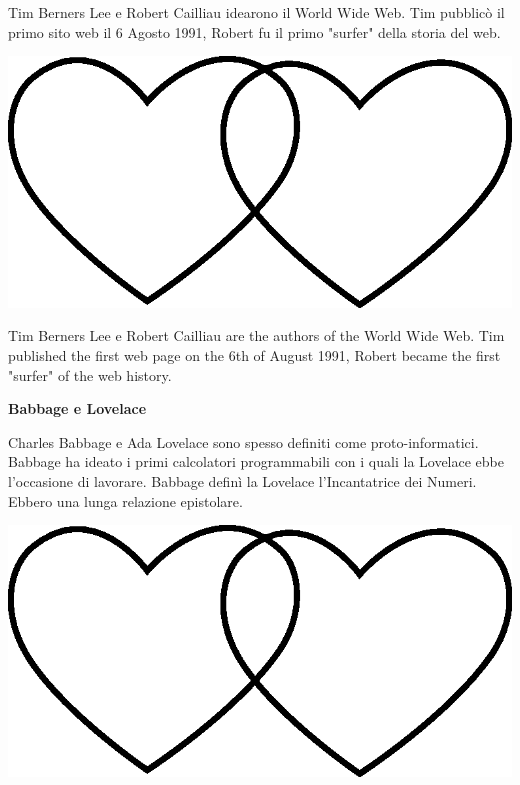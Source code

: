 \documentclass[11pt]{extarticle}
\begin{document}
\newpage
{}
\vspace*{\fill}
\begin{center}
Tim Berners Lee e Robert Cailliau idearono il World Wide Web. Tim pubblicò il primo sito web il 6 Agosto 1991, Robert fu il primo "surfer" della storia del web.\\
\begin{center}
\includegraphics[scale=0.1]{img/cuori_venn.eps}\\
\end{center}
\end{center}
\begin{center}
Tim Berners Lee e Robert Cailliau are the authors of the World Wide Web. Tim published the first web page on the 6th of August 1991, Robert became the first "surfer" of the web history.\\
\end{center}
\vspace*{\fill}
\newpage
\begin{center}
\vspace*{\fill}
{\Huge \textbf{Babbage e Lovelace\\}}
\vspace*{\fill}
\end{center}
\newpage
{}
\vspace*{\fill}
\begin{center}
Charles Babbage e Ada Lovelace sono spesso definiti come proto-informatici. Babbage ha ideato i primi calcolatori programmabili con i quali la Lovelace ebbe l'occasione di lavorare. Babbage definì la Lovelace l'Incantatrice dei Numeri. Ebbero una lunga relazione epistolare.\\
\begin{center}
\includegraphics[scale=0.1]{img/cuori_venn.eps}\\
\end{center}
\end{center}
\end{document}
